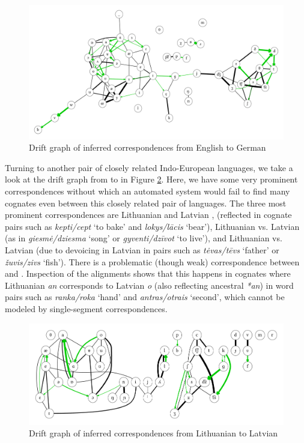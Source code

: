 \begin{figure}
    \includegraphics[width=\textwidth]{figures/drift-graph-en-de.pdf}
    \caption{Drift graph of inferred correspondences from English to German}
    \label{fig:driftGraphEnDe}
\end{figure}

Turning to another pair of closely related Indo-European languages, we take a look at the drift graph from  to  in Figure \ref{fig:driftGraphLtLv}. Here, we have some very prominent correspondences without which an automated system would fail to find many cognates even between this closely related pair of languages. The three most prominent correspondences are Lithuanian \ipa{[k]} and Latvian \ipa{[\t{ts}]}, (reflected in cognate pairs such as \textit{kepti/cept} `to bake' and \textit{lokys/l\={a}cis} `bear'), Lithuanian \ipa{[g]} vs. Latvian \ipa{[\t{dz}]} (as in \textit{giesm\.{e}/dziesma} `song' or \textit{gyventi/dz\=ivot} `to live'), and Lithuanian \ipa{[V]} vs. Latvian \ipa{[f]} (due to devoicing in Latvian in pairs such as \textit{t\.{e}vas/t\={e}vs} `father' or \textit{\v{z}uvis/zivs} `fish'). There is a problematic (though weak) correspondence between \ipa{[n]} and \ipa{[O]}. Inspection of the alignments shows that this happens in cognates where Lithuanian \textit{an} \ipa{[5n]} corresponds to Latvian \textit{o} \ipa{[uO]} (also reflecting ancestral \textit{*an}) in word pairs such as \textit{ranka/roka} `hand' and \textit{antras/otrais} `second', which cannot be modeled by single-segment correspondences.

\begin{figure}
    \includegraphics[width=\textwidth]{figures/drift-graph-lt-lv.pdf}
    \caption{Drift graph of inferred correspondences from Lithuanian to Latvian}
    \label{fig:driftGraphLtLv}
\end{figure}

